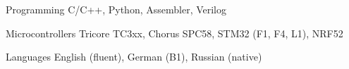 


\begin{cvskills}


\cvskill
{Programming} %
{C/C++, Python, Assembler, Verilog} %


\cvskill
{Microcontrollers} %
{Tricore TC3xx, Chorus SPC58, STM32 (F1, F4, L1), NRF52} %


\cvskill
{Languages} %
{ English (fluent), German (B1), Russian (native)} %


\end{cvskills}